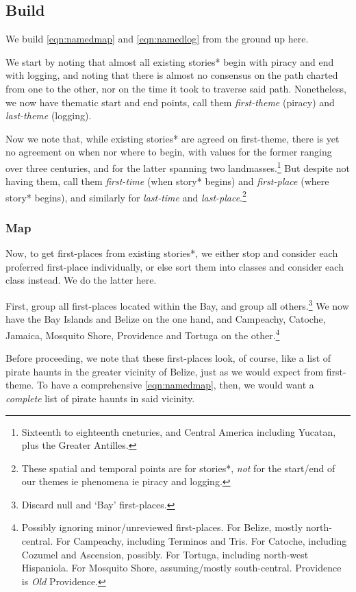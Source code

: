\documentclass{amsart}
\newcommand{\ment}[1]{\textit{#1}} %
\theoremstyle{definition}
\theoremstyle{remark}
\begin{document}
	\subsection{Build}
	\label{ss:build}
		We build \ref{eqn:namedmap} and \ref{eqn:namedlog} from the ground up here.
		
		We start by noting that almost all existing stories* begin with piracy and end with logging, and noting that there is almost no consensus on the path charted from one to the other, nor on the time it took to traverse said path. Nonetheless, we now have thematic start and end points, call them \ment{first-theme} (piracy) and \ment{last-theme} (logging).
		
		Now we note that, while existing stories* are agreed on first-theme, there is yet no agreement on when nor where to begin, with values for the former ranging over three centuries, and for the latter spanning two landmasses.\footnote{Sixteenth to eighteenth cneturies, and Central America including Yucatan, plus the Greater Antilles.} But despite not having them, call them \ment{first-time} (when story* begins) and \ment{first-place} (where story* begins), and similarly for \ment{last-time} and \ment{last-place}.\footnote{These spatial and temporal points are for stories*, \emph{not} for the start/end of our themes ie phenomena ie piracy and logging.}
		\subsubsection{Map}
		\label{sss:map}
			Now, to get first-places from existing stories*, we either stop and consider each proferred first-place individually, or else sort them into classes and consider each class instead. We do the latter here.
		
			First, group all first-places located within the Bay, and group all others.\footnote{Discard null and `Bay' first-places.} We now have the Bay Islands and Belize on the one hand, and Campeachy, Catoche, Jamaica, Mosquito Shore, Providence and Tortuga on the other.\footnote{Possibly ignoring minor/unreviewed first-places. For Belize, mostly north-central. For Campeachy, including Terminos and Tris. For Catoche, including Cozumel and Ascension, possibly. For Tortuga, including north-west Hispaniola. For Mosquito Shore, assuming/mostly south-central. Providence is \emph{Old} Providence.}
		
			Before proceeding, we note that these first-places look, of course, like a list of pirate haunts in the greater vicinity of Belize, just as we would expect from first-theme. To have a comprehensive \ref{eqn:namedmap}, then, we would want a \emph{complete} list of pirate haunts in said vicinity.
		
\end{document}

